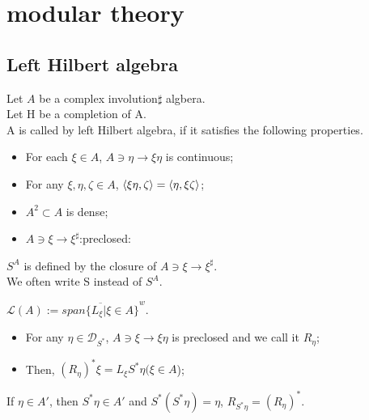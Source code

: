 
\section{modular theory}

\subsection{Left Hilbert algebra}
\begin{definition}
  Let $A$ be a complex involution$\sharp$ algbera. \\
  Let H be a completion of A. \\
  A is called by left Hilbert algebra, if it satisfies the following properties.\\
  \begin{itemize}
    \item For each $\xi \in A$, $A \ni \eta \rightarrow \xi\eta$ is continuous;
    \item For any $\xi,\eta,\zeta \in A$, $\langle \xi\eta,\zeta\rangle=\langle\eta,\xi\zeta\rangle$;
    \item $A^2 \subset A$ is dense;
    \item $A \ni \xi \rightarrow \xi^\sharp$:preclosed:
  \end{itemize}
\end{definition}

\begin{definition}
  $S^A$ is defined by the closure of $A \ni \xi \rightarrow \xi^\sharp$.\\
  We often write S instead of $S^A$.
\end{definition}

\begin{definition}
  $\mathcal{L}(A) := \overline{span\{L_\xi | \xi \in A\}}^w$.
\end{definition}

\begin{proposition}
  \begin{itemize}
    \item For any $\eta \in \mathcal{D}_{S^*}$, $A \ni \xi \rightarrow \xi\eta$ is preclosed and we call it $R_\eta$;
    \item Then, $(R_\eta)^*\xi=L_\xi S^*\eta (\xi \in A$);
  \end{itemize}
\end{proposition}

\begin{corollary}
  If $\eta \in A'$, then $S^*\eta \in A'$ and $S^*(S^*\eta)=\eta$, $R_{S^*\eta}=(R_\eta)^*$.
\end{corollary}

